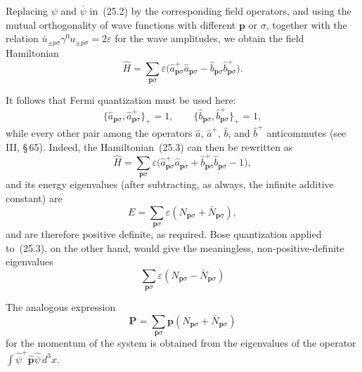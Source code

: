 Replacing $\psi$ and $\bar\psi$ in~(25.2) by the corresponding field operators, and using the mutual orthogonality of wave functions with different $\mathbf{p}$ or $\sigma$, together with the relation $\bar u_{\pm p\sigma}\gamma^0 u_{\pm p\sigma} = 2\varepsilon$ for the wave amplitudes, we obtain the field Hamiltonian
\begin{equation}
\widehat H = \sum_{\mathbf{p}\sigma}\varepsilon\bigl(\widehat a^+_{\mathbf{p}\sigma}\widehat a_{\mathbf{p}\sigma} - \widehat b_{\mathbf{p}\sigma}\widehat b^+_{\mathbf{p}\sigma}\bigr).
\tag{25.3}
\end{equation}

It follows that Fermi quantization must be used here:
\begin{equation}
\{\widehat a_{\mathbf{p}\sigma}, \widehat a^+_{\mathbf{p}\sigma}\}_+ = 1,\qquad \{\widehat b_{\mathbf{p}\sigma}, \widehat b^+_{\mathbf{p}\sigma}\}_+ = 1,
\tag{25.4}
\end{equation}
while every other pair among the operators $\widehat a$, $\widehat a^+$, $\widehat b$, and $\widehat b^+$ anticommutes (see III, \S\,65). Indeed, the Hamiltonian~(25.3) can then be rewritten as
\[
\widehat H = \sum_{\mathbf{p}\sigma}\varepsilon\bigl(\widehat a^+_{\mathbf{p}\sigma}\widehat a_{\mathbf{p}\sigma} + \widehat b^+_{\mathbf{p}\sigma}\widehat b_{\mathbf{p}\sigma} - 1\bigr),
\]
and its energy eigenvalues (after subtracting, as always, the infinite additive constant) are
\begin{equation}
E = \sum_{\mathbf{p}\sigma}\varepsilon(N_{\mathbf{p}\sigma} + \bar N_{\mathbf{p}\sigma}),
\tag{25.5}
\end{equation}
and are therefore positive definite, as required. Bose quantization applied to~(25.3), on the other hand, would give the meaningless, non-positive-definite eigenvalues
\[
\sum_{\mathbf{p}\sigma}\varepsilon(N_{\mathbf{p}\sigma} - \bar N_{\mathbf{p}\sigma})
\]

The analogous expression
\begin{equation}
\mathbf{P} = \sum_{\mathbf{p}\sigma}\mathbf{p}(N_{\mathbf{p}\sigma} + \bar N_{\mathbf{p}\sigma})
\tag{25.6}
\end{equation}
for the momentum of the system is obtained from the eigenvalues of the operator $\int \widehat\psi^+\widehat{\mathbf{p}}\widehat\psi\,d^3x$.

